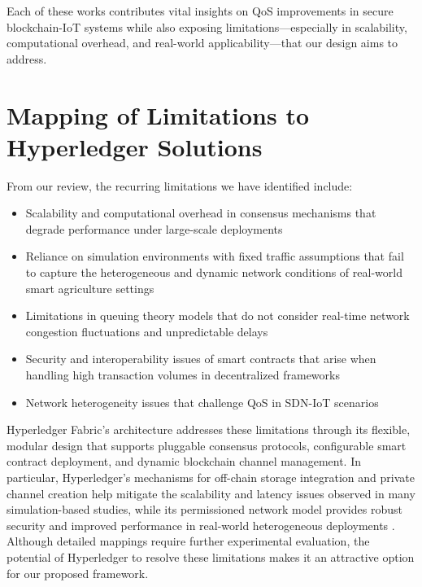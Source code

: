 \documentclass[12pt,onecolumn]{IEEEtran} %
\begin{document}
Each of these works contributes vital insights on QoS improvements in secure blockchain-IoT systems while also exposing limitations---especially in scalability, computational overhead, and real-world applicability---that our design aims to address.

\section*{Mapping of Limitations to Hyperledger Solutions}
From our review, the recurring limitations we have identified include: 
\begin{itemize}
\item Scalability and computational overhead in consensus mechanisms that degrade performance under large-scale deployments \cite{agrawal2022mlsmbqsdesignof,haque2024ascalableblockchain}
\item Reliance on simulation environments with fixed traffic assumptions that fail to capture the heterogeneous and dynamic network conditions of real-world smart agriculture settings \cite{habeeb2022dynamicbandwidthslicing,zhang2024ondemandcentralizedresource}
\item Limitations in queuing theory models that do not consider real-time network congestion fluctuations and unpredictable delays \cite{habeeb2022dynamicbandwidthslicing,zhang2024ondemandcentralizedresource}
\item Security and interoperability issues of smart contracts that arise when handling high transaction volumes in decentralized frameworks \cite{gupta2025enhancingblockchainqualityofservice}
\item Network heterogeneity issues that challenge QoS in SDN-IoT scenarios \cite{zafar2023anadvancedstrategy}
\end{itemize}

Hyperledger Fabric's architecture addresses these limitations through its flexible, modular design that supports pluggable consensus protocols, configurable smart contract deployment, and dynamic blockchain channel management. In particular, Hyperledger's mechanisms for off-chain storage integration and private channel creation help mitigate the scalability and latency issues observed in many simulation-based studies, while its permissioned network model provides robust security and improved performance in real-world heterogeneous deployments \cite{pajooh2022experimentalperformanceanalysis}. Although detailed mappings require further experimental evaluation, the potential of Hyperledger to resolve these limitations makes it an attractive option for our proposed framework.
\end{document}
